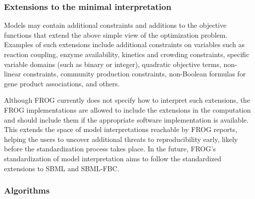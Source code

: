 \subsubsection{Extensions to the minimal interpretation}

Models may contain additional constraints and additions to the objective functions that extend the above simple view of the optimization problem.
Examples of such extensions include additional constraints on variables such as reaction coupling, enzyme availability, kinetics and crowding constraints, specific variable domains (such as binary or integer), quadratic objective terms, non-linear constraints, community production constraints, non-Boolean formulas for gene product associations, and others.

Although FROG currently does not specify how to interpret such extensions, the FROG implementations are allowed to include the extensions in the computation and should include them if the appropriate software implementation is available.
This extends the space of model interpretations reachable by FROG reports, helping the users to uncover additional threats to reproducibility early, likely before the standardization process takes place.
In the future, FROG's standardization of model interpretation aims to follow the standardized extensions to SBML and SBML-FBC.~\cite{keating2020sbml,olivier2018sbmlfbc}

\subsubsection{Algorithms}

